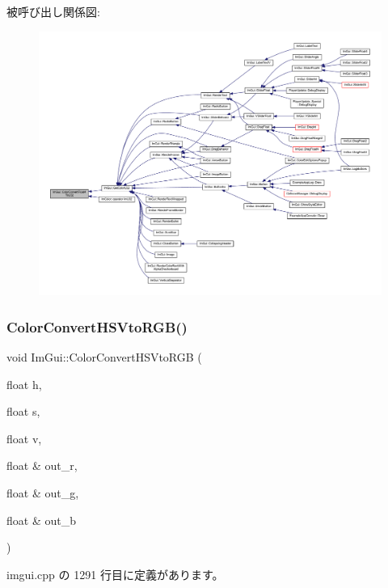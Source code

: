 被呼び出し関係図\+:\nopagebreak
\begin{figure}[H]
\begin{center}
\leavevmode
\includegraphics[width=350pt]{namespace_im_gui_abe2691de0b1a71c774ab24cc91564a94_icgraph}
\end{center}
\end{figure}
\mbox{\label{namespace_im_gui_a074427678b3e56378b7dcdefa4c8b5c7}} 
\subsubsection{\texorpdfstring{Color\+Convert\+H\+S\+Vto\+R\+G\+B()}{ColorConvertHSVtoRGB()}}
{\footnotesize\ttfamily void Im\+Gui\+::\+Color\+Convert\+H\+S\+Vto\+R\+GB (\begin{DoxyParamCaption}\item[{float}]{h,  }\item[{float}]{s,  }\item[{float}]{v,  }\item[{float \&}]{out\+\_\+r,  }\item[{float \&}]{out\+\_\+g,  }\item[{float \&}]{out\+\_\+b }\end{DoxyParamCaption})}



 imgui.\+cpp の 1291 行目に定義があります。

